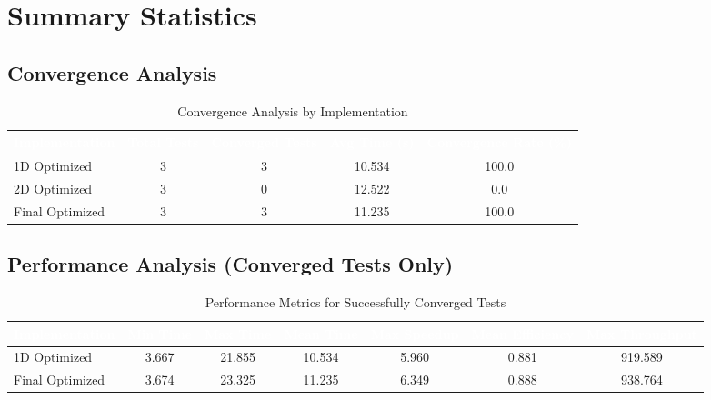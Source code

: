 \documentclass[11pt]{article}
\begin{document}
\section{Summary Statistics}

\subsection{Convergence Analysis}

\begin{table}[H]
\centering
\caption{Convergence Analysis by Implementation}
\label{tab:convergence_analysis}
\begin{tabular}{>{}l c c S[table-format=2.3] S[table-format=3.1]}
\hline
{}
\textcolor{white}{\textbf{Implementation}} & 
\textcolor{white}{\textbf{Total Tests}} & 
\textcolor{white}{\textbf{Converged Tests}} & 
\textcolor{white}{\textbf{Avg Time (s)}} & 
\textcolor{white}{\textbf{Convergence Rate (\%)}} \\
\hline

1D Optimized & 3 & 3 & 10.534 & 100.0 \\

2D Optimized & 3 & 0 & 12.522 & 0.0 \\

Final Optimized & 3 & 3 & 11.235 & 100.0 \\

\hline
\end{tabular}
\end{table}

\subsection{Performance Analysis (Converged Tests Only)}

\begin{table}[H]
\centering
\caption{Performance Metrics for Successfully Converged Tests}
\label{tab:performance_analysis}
\scriptsize
\begin{tabular}{>{}l S[table-format=2.3] S[table-format=2.3] S[table-format=2.3] S[table-format=1.3] S[table-format=1.3] S[table-format=3.3]}
\toprule
{}
\textcolor{white}{\textbf{Implementation}} & 
\textcolor{white}{\textbf{Min Time}} & 
\textcolor{white}{\textbf{Max Time}} & 
\textcolor{white}{\textbf{Mean Time}} & 
\textcolor{white}{\textbf{Max Speedup}} & 
\textcolor{white}{\textbf{Mean Efficiency}} & 
\textcolor{white}{\textbf{Max Throughput}} \\
\midrule

1D Optimized & 3.667 & 21.855 & 10.534 & 5.960 & 0.881 & 919.589 \\

Final Optimized & 3.674 & 23.325 & 11.235 & 6.349 & 0.888 & 938.764 \\

\bottomrule
\end{tabular}
\end{table}
\end{document}
